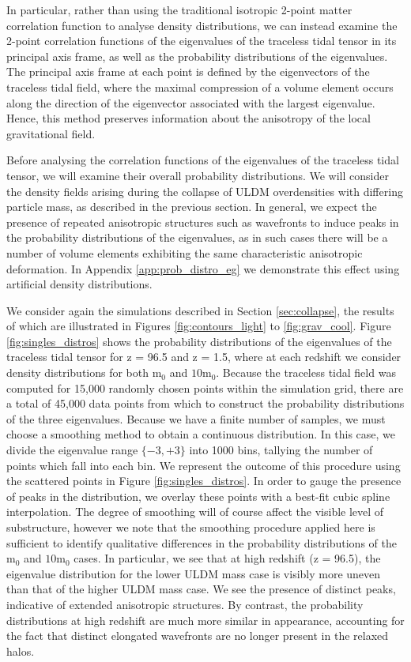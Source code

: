 \documentclass[a4paper,11pt]{article}
\begin{document}
In particular, rather than using the traditional isotropic 2-point matter correlation function to analyse density distributions, we can instead examine the 2-point correlation functions of the eigenvalues of the traceless tidal tensor in its principal axis frame, as well as the probability distributions of the eigenvalues. The principal axis frame at each point is defined by the eigenvectors of the traceless tidal field, where the maximal compression of a volume element occurs along the direction of the eigenvector associated with the largest eigenvalue. Hence, this method preserves information about the anisotropy of the local gravitational field. 

Before analysing the correlation functions of the eigenvalues of the traceless tidal tensor, we will examine their overall probability distributions. We will consider the density fields arising during the collapse of ULDM overdensities with differing particle mass, as described in the previous section. In general, we expect the presence of repeated anisotropic structures such as wavefronts to induce peaks in the probability distributions of the eigenvalues, as in such cases there will be a number of volume elements exhibiting the same characteristic anisotropic deformation. In Appendix \ref{app:prob_distro_eg} we demonstrate this effect using artificial density distributions. 

We consider again the simulations described in Section \ref{sec:collapse}, the results of which are illustrated in Figures \ref{fig:contours_light} to \ref{fig:grav_cool}. Figure \ref{fig:singles_distros} shows the probability distributions of the eigenvalues of the traceless tidal tensor for z = 96.5 and z = 1.5, where at each redshift we consider density distributions for both $\mathrm{m}_0$ and $\mathrm{10m}_0$. Because the traceless tidal field was computed for 15,000 randomly chosen points within the simulation grid, there are a total of 45,000 data points from which to construct the probability distributions of the three eigenvalues. Because we have a finite number of samples, we must choose a smoothing method to obtain a continuous distribution. In this case, we divide the eigenvalue range $\{-3,+3\}$ into 1000 bins, tallying the number of points which fall into each bin. We represent the outcome of this procedure using the scattered points in Figure \ref{fig:singles_distros}. In order to gauge the presence of peaks in the distribution, we overlay these points with a best-fit cubic spline interpolation. The degree of smoothing will of course affect the visible level of substructure, however we note that the smoothing procedure applied here is sufficient to identify qualitative differences in the probability distributions of the $\mathrm{m}_0$ and $\mathrm{10m}_0$ cases. In particular, we see that at high redshift (z = 96.5), the eigenvalue distribution for the lower ULDM mass case is visibly more uneven than that of the higher ULDM mass case. We see the presence of distinct peaks, indicative of extended anisotropic structures. By contrast, the probability distributions at high redshift are much more similar in appearance, accounting for the fact that distinct elongated wavefronts are no longer present in the relaxed halos. 
\end{document}
